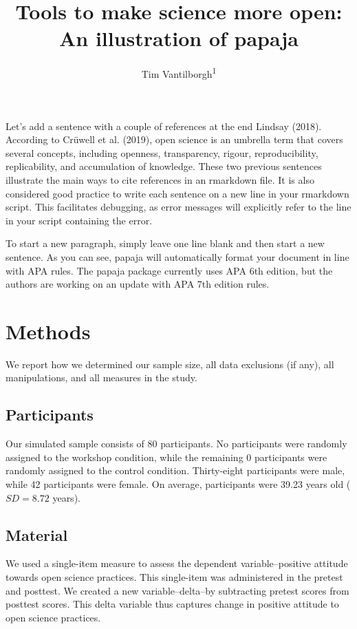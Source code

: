 \documentclass[
  man]{apa6}
\title{Tools to make science more open: An illustration of papaja}
\author{Tim Vantilborgh\textsuperscript{1}}
\date{}
\affiliation{\vspace{0.5cm}\textsuperscript{1} Vrije Universiteit Brussel}
\begin{document}
\maketitle

Let's add a sentence with a couple of references at the end Lindsay (2018). According to Crüwell et al. (2019), open science is an umbrella term that covers several concepts, including openness, transparency, rigour, reproducibility, replicability, and accumulation of knowledge. These two previous sentences illustrate the main ways to cite references in an rmarkdown file. It is also considered good practice to write each sentence on a new line in your rmarkdown script. This facilitates debugging, as error messages will explicitly refer to the line in your script containing the error.

To start a new paragraph, simply leave one line blank and then start a new sentence. As you can see, papaja will automatically format your document in line with APA rules. The papaja package currently uses APA 6th edition, but the authors are working on an update with APA 7th edition rules.

\hypertarget{methods}{%
\section{Methods}\label{methods}}

We report how we determined our sample size, all data exclusions (if any), all manipulations, and all measures in the study.

\hypertarget{participants}{%
\subsection{Participants}\label{participants}}

Our simulated sample consists of 80 participants. No participants were randomly assigned to the workshop condition, while the remaining 0 participants were randomly assigned to the control condition. Thirty-eight participants were male, while 42 participants were female. On average, participants were 39.23 years old (\(SD = 8.72\) years).

\hypertarget{material}{%
\subsection{Material}\label{material}}

We used a single-item measure to assess the dependent variable--positive attitude towards open science practices. This single-item was administered in the pretest and posttest. We created a new variable--delta--by subtracting pretest scores from posttest scores. This delta variable thus captures change in positive attitude to open science practices.
\end{document}
